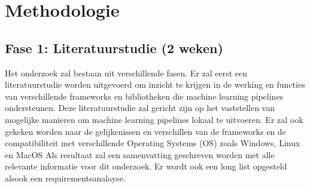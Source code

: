 




\section{Methodologie}%
\label{sec:methodologie}

\subsection{Fase 1: Literatuurstudie (2 weken)}
Het onderzoek zal bestaan uit verschillende fasen. Er zal eerst een literatuurstudie worden uitgevoerd om inzicht te krijgen in de werking en
functies van verschillende frameworks en bibliotheken die machine learning pipelines ondersteunen.
Deze literatuurstudie zal gericht zijn op het vaststellen van mogelijke manieren om machine learning pipelines lokaal te uitvoeren. Er zal ook gekeken worden naar de gelijkenissen en verschillen van de frameworks en de compatibiliteit met verschillende Operating Systems (OS) zoals Windows, Linux en MacOS
Als resultaat zal een samenvatting geschreven worden met alle relevante informatie voor dit onderzoek.
Er wordt ook een long list opgesteld alsook een requirementsanalayse.\\

